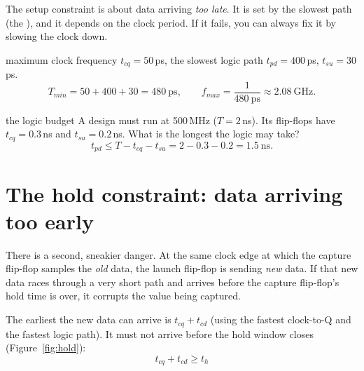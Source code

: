 \begin{bigidea}
The setup constraint is about data arriving \emph{too late}. It is set by the slowest path (the ), and it depends on the clock period. If it fails, you can always fix it by slowing the clock down.
\end{bigidea}

\begin{worked}{maximum clock frequency}
$t_{cq} = 50$\,ps, the slowest logic path $t_{pd} = 400$\,ps, $t_{su} = 30$\,ps.
\[
  T_{min} = 50 + 400 + 30 = 480~\text{ps}, \qquad f_{max} = \frac{1}{480~\text{ps}} \approx 2.08~\text{GHz}.
\]
\end{worked}

\begin{worked}{the logic budget}
A design must run at 500\,MHz ($T = 2$\,ns). Its flip-flops have $t_{cq} = 0.3$\,ns and $t_{su} = 0.2$\,ns. What is the longest the logic may take?
\[
  t_{pd} \le T - t_{cq} - t_{su} = 2 - 0.3 - 0.2 = 1.5~\text{ns}.
\]
\end{worked}

\section{The hold constraint: data arriving too early}

There is a second, sneakier danger. At the same clock edge at which the capture flip-flop samples the \emph{old} data, the launch flip-flop is sending \emph{new} data. If that new data races through a very short path and arrives before the capture flip-flop's hold time is over, it corrupts the value being captured.

The earliest the new data can arrive is $t_{cq} + t_{cd}$ (using the fastest clock-to-Q and the fastest logic path). It must not arrive before the hold window closes (Figure~\ref{fig:hold}):
\[
  \boxed{t_{cq} + t_{cd} \ge t_h}
\]

